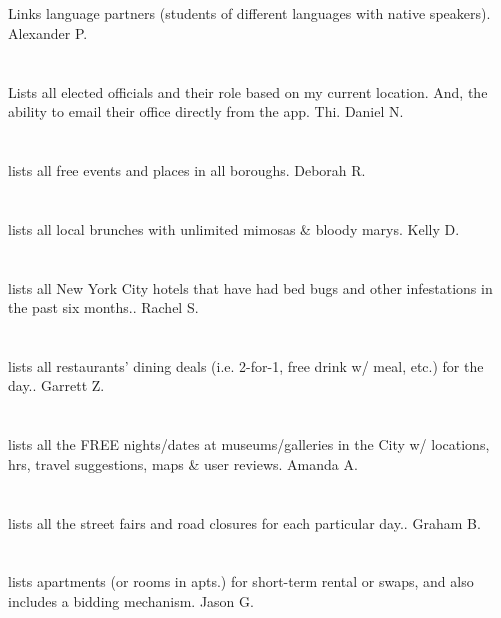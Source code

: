 \section{}Links language partners (students of different languages with native speakers). Alexander P.
\section{}Lists all elected officials and their role based on my current location. And,  the ability to email their office directly from the app.   Thi. Daniel N.
\section{}lists all free events and places in all boroughs. Deborah R.
\section{}lists all local brunches with unlimited mimosas \& bloody marys. Kelly D.
\section{}lists all New York City hotels that have had bed bugs and other infestations in the past six months.. Rachel S.
\section{}lists all restaurants' dining deals (i.e. 2-for-1,  free drink w/ meal,  etc.) for the day.. Garrett Z.
\section{}lists all the FREE nights/dates at museums/galleries in the City w/ locations,  hrs,  travel suggestions,  maps \& user reviews. Amanda A.
\section{}lists all the street fairs and road closures for each particular day.. Graham B.
\section{}lists apartments (or rooms in apts.) for short-term rental or swaps,  and also includes a bidding mechanism. Jason G.
